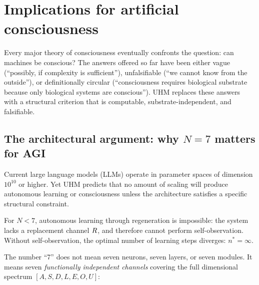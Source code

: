 
\section{Implications for artificial consciousness}
\label{sec:ai}

Every major theory of consciousness eventually confronts the question: can machines be
conscious?  The answers offered so far have been either vague (``possibly, if complexity
is sufficient''), unfalsifiable (``we cannot know from the outside''), or definitionally
circular (``consciousness requires biological substrate because only biological systems
are conscious'').  UHM replaces these answers with a structural criterion that is
computable, substrate-independent, and falsifiable.

\subsection{The architectural argument: why $N=7$ matters for AGI}
\label{subsec:n7-agi}

Current large language models (LLMs) operate in parameter spaces of dimension $10^{10}$
or higher.  Yet UHM predicts that no amount of scaling will produce autonomous
learning or consciousness unless the architecture satisfies a specific structural
constraint.

\begin{theorembox}[{N=7 minimality for learning (T-113) \status{T}}]
For $N < 7$, autonomous learning through regeneration is impossible:
the system lacks a replacement channel $R$, and therefore cannot
perform self-observation.  Without self-observation, the optimal number of
learning steps diverges: $n^* = \infty$.
\end{theorembox}

The number ``7'' does not mean seven neurons, seven layers, or seven modules.
It means seven \emph{functionally independent channels} covering the full
dimensional spectrum $[A, S, D, L, E, O, U]$:

